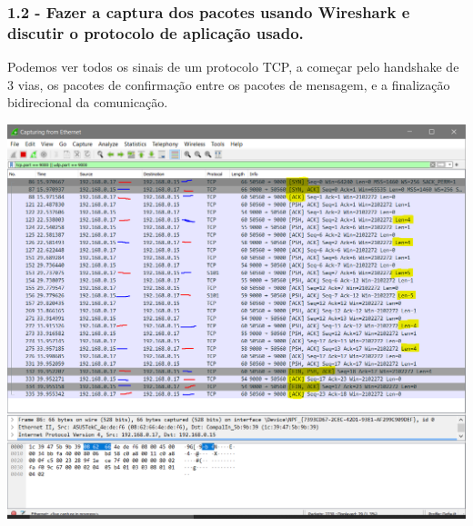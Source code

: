 \pagebreak

\subsubsection{1.2 - Fazer a captura dos pacotes usando Wireshark e discutir o protocolo de aplicação usado.}

Podemos ver todos os sinais de um protocolo TCP, a começar pelo handshake de 3 vias, os pacotes de confirmação entre os pacotes de mensagem, e a finalização bidirecional da comunicação.

\vspace{2em}
\begin{minipage}{\textwidth}
    \hspace{-1em}
    \centering
    \includegraphics[scale=.3]{prints/wireshark-threaded.PNG}
    \label{threadspng}
    \hspace{1em}
\end{minipage}
\vspace{0.5em}

